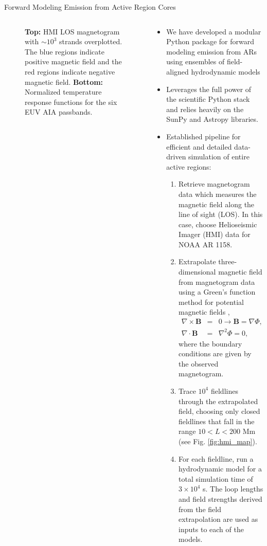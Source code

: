 \documentclass[final]{beamer}
\begin{document}
\begin{frame}
\begin{columns}[T]
\begin{column}{0.49\linewidth}
\begin{block}{Forward Modeling Emission from Active Region Cores}
\begin{columns}[c]
\begin{column}{0.49\columnwidth}
\begin{figure}
{                \label{fig:response_functions}}
                \caption{\textbf{Top:} HMI LOS magnetogram with $\sim10^3$ strands overplotted. The blue regions indicate positive magnetic field and the red regions indicate negative magnetic field. \textbf{Bottom:} Normalized temperature response functions for the six EUV AIA passbands.}
            \end{figure}
        \end{column}
        \begin{column}{0.49\columnwidth}
            \begin{itemize}
                \item We have developed a modular Python package for forward modeling emission from ARs using ensembles of field-aligned hydrodynamic models
                \item Leverages the full power of the scientific Python stack and relies heavily on the SunPy \citep{sunpy_community_sunpypython_2015} and Astropy \citep{astropy_collaboration_astropy:_2013} libraries.
                \item Established pipeline for efficient and detailed data-driven simulation of \alert{entire active regions}:
                \begin{enumerate}
                    \item Retrieve magnetogram data which measures the magnetic field along the line of sight (LOS). In this case, choose Helioseismic Imager (HMI) data for NOAA AR 1158.
                    \item Extrapolate three-dimensional magnetic field from magnetogram data using a Green's function method for potential magnetic fields \citep{sakurai_greens_1982},
                    \begin{eqnarray*}
                        \nabla\times\mathbf{B} &=& 0 \rightarrow \mathbf{B} = \nabla\Phi, \\
                        \nabla\cdot\mathbf{B} &=& \nabla^2\Phi = 0,
                    \end{eqnarray*}
                    where the boundary conditions are given by the observed magnetogram.
                    \item Trace $10^4$ fieldlines through the extrapolated field, choosing only \alert{closed} fieldlines that fall in the range $10<L<200$ Mm (see Fig. \ref{fig:hmi_map}).
                    \item For each fieldline, run a hydrodynamic model for a total simulation time of $3\times10^4$ s. The loop lengths and field strengths derived from the field extrapolation are used as inputs to each of the models.

\end{enumerate}
\end{itemize}
\end{column}
\end{columns}
\end{block}
\end{column}
\end{columns}
\end{frame}
\end{document}
